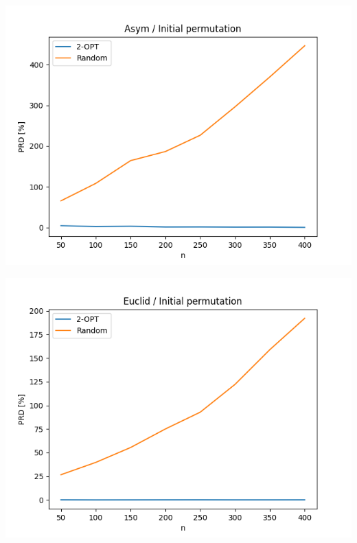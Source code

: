 \documentclass{article}
\begin{document}
\begin{center}
\includegraphics[width=\textwidth, 
                   height = 0.4\textheight, 
                   keepaspectratio]
                  {plots/asym_2_gen_rand} 
\end{center}

\begin{center}
\includegraphics[width=\textwidth, 
                   height = 0.4\textheight, 
                   keepaspectratio]
                  {plots/euclid_2_gen_rand} 
\end{center}
\end{document}
